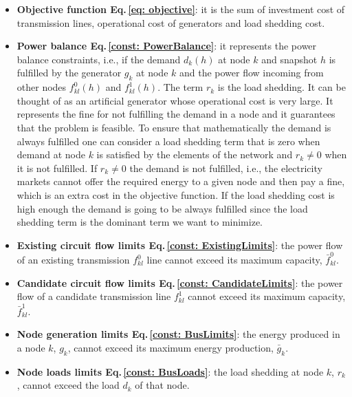 \begin{itemize}
    \item \textbf{Objective function Eq.\,\eqref{eq: objective}}: it is the sum of investment cost of transmission lines, operational cost of generators and load shedding cost.
    \item \textbf{Power balance Eq.\,\eqref{const: PowerBalance}}: it represents the power balance constraints, i.e., if the demand $d_{k}(h)$ at node $k$ and snapshot $h$ is fulfilled by the generator $g_{k}$ at node $k$ and the power flow incoming from other nodes $f_{kl}^{0}(h)$ and $f_{kl}^{1}(h)$. The term $r_{k}$ is the load shedding. It can be thought of as an artificial generator whose operational cost is very large. It represents the fine for not fulfilling the demand in a node and it guarantees that the problem is feasible. To ensure that mathematically the demand is always fulfilled one can consider a load shedding term that is zero when demand at node $k$ is satisfied by the elements of the network and $r_{k} \neq 0$ when it is not fulfilled. If $r_{k} \neq 0$ the demand is not fulfilled, i.e., the electricity markets cannot offer the required energy to a given node and then pay a fine, which is an extra cost in the objective function. If the load shedding cost is high enough the demand is going to be always fulfilled since the load shedding term is the dominant term we want to minimize.
    \item \textbf{Existing circuit flow limits Eq.\,\eqref{const: ExistingLimits}}: the power flow of an existing transmission $f_{kl}^{0}$ line cannot exceed its maximum capacity, $\bar{f}_{kl}^{0}$.
    \item \textbf{Candidate circuit flow limits Eq.\,\eqref{const: CandidateLimits}}: the power flow of a candidate transmission line $f_{kl}^{1}$ cannot exceed its maximum capacity, $\bar{f}_{kl}^{1}$.
    \item \textbf{Node generation limits Eq.\,\eqref{const: BusLimits}}: the energy produced in a node $k$, $g_{k}$, cannot exceed its maximum energy production, $\bar{g}_{k}$.
    \item \textbf{Node loads limits Eq.\,\eqref{const: BusLoads}}: the load shedding at node $k$, $r_{k}$, cannot exceed the load $d_{k}$ of that node. 
\end{itemize}
